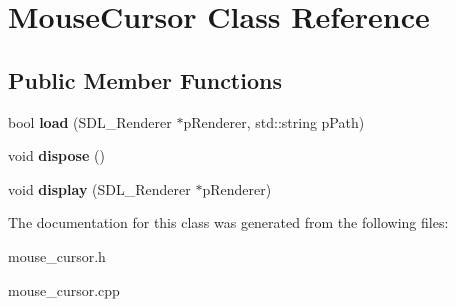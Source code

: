 \hypertarget{classMouseCursor}{}\section{Mouse\+Cursor Class Reference}
\label{classMouseCursor}
\subsection*{Public Member Functions}
\begin{DoxyCompactItemize}
\item 
\mbox{\label{classMouseCursor_aacd46cb4b9f4c4a516af520e3f313579}} 
bool {\bfseries load} (S\+D\+L\+\_\+\+Renderer $\ast$p\+Renderer, std\+::string p\+Path)
\item 
\mbox{\label{classMouseCursor_a1c7d67563f6f8d441f25dee2b1707f88}} 
void {\bfseries dispose} ()
\item 
\mbox{\label{classMouseCursor_a0f4a08c31b05bdd50f3354a30689cc5c}} 
void {\bfseries display} (S\+D\+L\+\_\+\+Renderer $\ast$p\+Renderer)
\end{DoxyCompactItemize}


The documentation for this class was generated from the following files\+:\begin{DoxyCompactItemize}
\item 
mouse\+\_\+cursor.\+h\item 
mouse\+\_\+cursor.\+cpp\end{DoxyCompactItemize}
